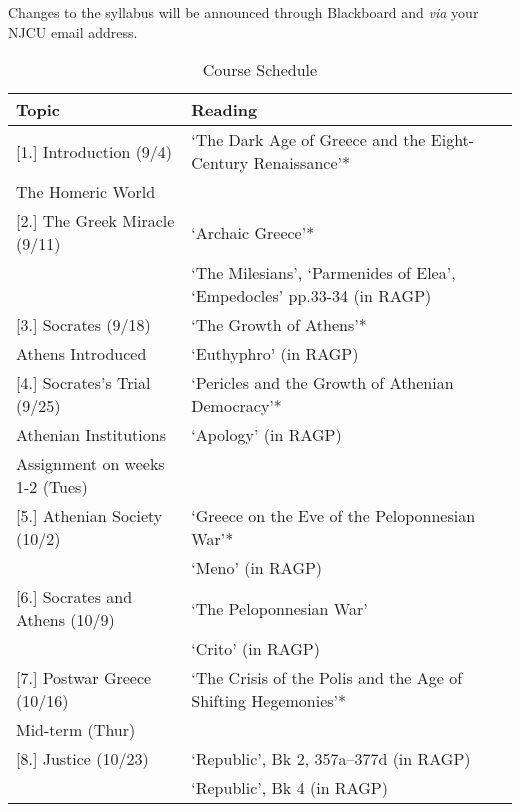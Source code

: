 \documentclass[article,oneside]{memoir}
\begin{document}
 Changes to the syllabus will be announced through Blackboard and \emph{via} your NJCU email address.  

\newpage
\begin{center}
\begin{longtable}{p{4.5cm}p{9cm}}
 
  \caption{Course Schedule} \\
  \toprule
  \textbf{Topic}   & \textbf{Reading} \\
  \midrule

  
[1.] Introduction (9/4) 			&  `The Dark Age of Greece and the Eight-Century Renaissance'* \\ 
The Homeric World				&     \\ [1\baselineskip] \midrule
	
[2.]  The Greek Miracle  (9/11)		 & `Archaic Greece'* \\
							 &`The Milesians', `Parmenides of Elea', `Empedocles' pp.33-34  (in RAGP)  \\ [1\baselineskip] \midrule

[3.] Socrates (9/18)	  			& `The Growth of Athens'*\\
Athens Introduced				&`Euthyphro'  (in RAGP)  \\ [1\baselineskip] \midrule

[4.] Socrates's Trial (9/25)			& `Pericles and the Growth of Athenian Democracy'*   \\ 
Athenian Institutions				& `Apology' (in RAGP)	\\
Assignment on weeks 1-2 (Tues)	& \\[1\baselineskip] \midrule

[5.] Athenian Society (10/2)		&  `Greece on the Eve of the Peloponnesian War'* \\
						    	&  `Meno' (in RAGP)	 \\ [1\baselineskip] \midrule


[6.] Socrates and Athens (10/9)		& `The Peloponnesian War' \\
							& `Crito' (in RAGP) \\ [1\baselineskip]  \midrule

[7.] Postwar Greece	(10/16)		&  `The Crisis of the Polis and the Age of Shifting Hegemonies'*  	\\ 
Mid-term (Thur)					& 	\\ [1\baselineskip] \midrule

[8.] Justice	(10/23)			&  `Republic', Bk 2, 357a--377d (in RAGP) \\
							&  `Republic', Bk 4 (in RAGP)  \\ [1\baselineskip] \midrule


\end{longtable}
\end{center}
\end{document}
